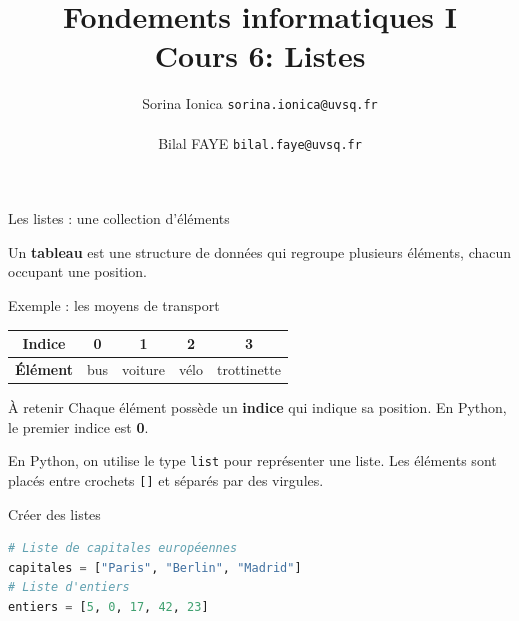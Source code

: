 \documentclass[10pt]{beamer}
\title[IN100 Cours 6]{\textbf{Fondements informatiques I}\\
Cours 6: Listes}
\author[]{Sorina Ionica \texttt{sorina.ionica@uvsq.fr} \\~\\Bilal FAYE  \texttt{bilal.faye@uvsq.fr} }
\institute{}
\date{}
\begin{document}
\frame{\titlepage}

\begin{frame}[fragile]{Les listes : une collection d'éléments}

Un \textbf{tableau} est une structure de données qui regroupe
plusieurs éléments, chacun occupant une position.

\begin{exampleblock}{Exemple : les moyens de transport}
\begin{center}
\begin{tabular}{c|c|c|c|c}
\textbf{Indice} & 0 & 1 & 2 & 3 \\ \hline
\textbf{Élément} & bus & voiture & vélo & trottinette
\end{tabular}
\end{center}
\end{exampleblock}

\begin{alertblock}{À retenir}
Chaque élément possède un \textbf{indice} qui indique sa position.
En Python, le premier indice est \textbf{0}.
\end{alertblock}

\pause

En Python, on utilise le type \texttt{list} pour représenter une liste.
Les éléments sont placés entre crochets \texttt{[]} et séparés par des virgules.

\begin{exampleblock}{Créer des listes}
\begin{lstlisting}[language=Python]
# Liste de capitales européennes
capitales = ["Paris", "Berlin", "Madrid"]
# Liste d'entiers
entiers = [5, 0, 17, 42, 23]
\end{lstlisting}
\end{exampleblock}

\end{frame}
\end{document}
